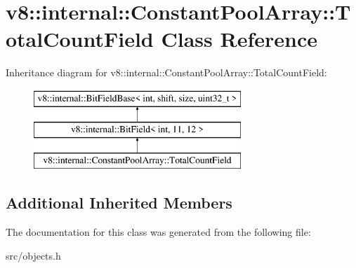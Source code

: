 \hypertarget{classv8_1_1internal_1_1_constant_pool_array_1_1_total_count_field}{}\section{v8\+:\+:internal\+:\+:Constant\+Pool\+Array\+:\+:Total\+Count\+Field Class Reference}
\label{classv8_1_1internal_1_1_constant_pool_array_1_1_total_count_field}
Inheritance diagram for v8\+:\+:internal\+:\+:Constant\+Pool\+Array\+:\+:Total\+Count\+Field\+:\begin{figure}[H]
\begin{center}
\leavevmode
\includegraphics[height=3.000000cm]{classv8_1_1internal_1_1_constant_pool_array_1_1_total_count_field}
\end{center}
\end{figure}
\subsection*{Additional Inherited Members}


The documentation for this class was generated from the following file\+:\begin{DoxyCompactItemize}
\item 
src/objects.\+h\end{DoxyCompactItemize}
